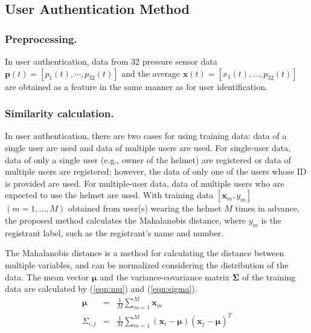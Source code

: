 \documentclass[sigchi,authordraft]{acmart}
\begin{document}
\subsection{User Authentication Method}
\subsubsection{Preprocessing.}
In user authentication, data from 32 pressure sensor data $\bm{p}(t)=[p_1(t),\cdots,p_{32}(t)]$ and the average $\bm{x}(t)=[x_{1}(t),\dots,p_{32}(t)]$ are obtained as a feature in the same manner as for user identification.




\subsubsection{Similarity calculation.}
In user authentication, there are two cases for using training data: data of a single user are used and data of multiple users are used. For single-user data, data of only a single user (e.g., owner of the helmet) are registered or data of multiple users are registered; however, the data of only one of the users whose ID is provided are used. For multiple-user data, data of multiple users who are expected to use the helmet are used. With training data $[\bm{x}_m,y_m]$ $(m=1,\dots, M)$ obtained from user(s) wearing the helmet $M$ times in advance, the proposed method calculates the Mahalanobis distance, where $y_m$ is the registrant label, such as the registrant's name and number.\par

The Mahalanobis distance is a method for calculating the distance between multiple variables, and can be normalized considering the distribution of the data. The mean vector $\bm{\mu}$ and the variance-covariance matrix $\bm{\Sigma}$ of the training data are calculated by (\ref{eqn:mu}) and (\ref{eqn:sigma}).
\begin{eqnarray}
\label{eqn:mu}
  \bm{\mu} &=& \frac{1}{M}\sum_{m=1}^{M}\bm{x}_m \\
\label{eqn:sigma}
  \Sigma_{i,j} &=& \frac{1}{M}\sum_{m=1}^{M}(\bm{x}_i-\bm{\mu})(\bm{x}_j-\bm{\mu})^T
\end{eqnarray}
 
\end{document}
